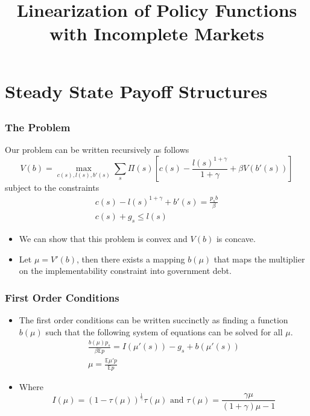 \documentclass{beamer}
\title{Linearization of Policy Functions with Incomplete Markets}
\newcommand{\EE}{\mathbb E}
\begin{document}
\maketitle
\section{Steady State Payoff Structures}
\subsection{}
\begin{frame}
	\frametitle{The Problem}
	Our problem can be written recursively as follows
	\[
	V(b) = \max_{c(s),l(s),b'(s)}\sum_s \Pi(s)\left[ c(s) - \frac{l(s)^{1+\gamma}}{1+\gamma}+ \beta V(b'(s)) \right]
\]subject to the constraints
\begin{subequations}
\begin{align}\label{eq.imp}
	c(s) - l(s)^{1+\gamma}  + b'(s)  = \frac{p_s b}{\beta}\\
	c(s) + g_s  \leq l(s)\label{eq.res}
\end{align}
\end{subequations}
\begin{itemize}
	\item We can show that this problem is convex and $V(b)$ is concave.
	\item Let $\mu = V'(b)$, then there exists a mapping $b(\mu)$ that maps the multiplier on the implementability constraint into government debt.
\end{itemize}
\end{frame}
\begin{frame}
	\frametitle{First Order Conditions}
	\begin{itemize}
		\item  The first order conditions can be written succinctly as finding a function $b(\mu)$ such that the following system of equations can be solved for all $\mu$.
		\begin{align}\label{eq.lin_imp}
	\frac{b(\mu)p_s}{\beta \EE p} = I(\mu'(s)) - g_s +b(\mu'(s))\\
	\mu = \frac{\EE\mu' p}{\EE p}\label{eq.lin_mart}
\end{align} 
	\item Where 
	\[
		I(\mu) = (1-\tau(\mu))^\frac1\gamma\tau(\mu) \text{  and  } \tau(\mu) = \frac{\gamma\mu}{(1+\gamma)\mu-1}
	\]
	\end{itemize}
\end{frame}
\end{document}
